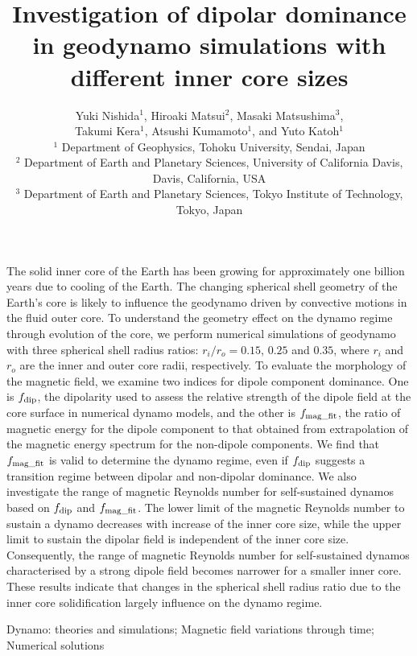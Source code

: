 \documentclass[mreferee]{gji}
\title[Dipolar dominance in geodynamo with different inner core sizes]
{Investigation of dipolar dominance in geodynamo simulations with different inner core sizes}
\author[Y. Nishida et al.]
{Yuki Nishida$^1$, Hiroaki Matsui$^2$, Masaki Matsushima$^3$,\\ 
{\rm \LARGE
Takumi Kera$^1$, Atsushi Kumamoto$^1$, and Yuto Katoh$^1$ }\\
  $^1$ Department of Geophysics, Tohoku University, Sendai, Japan \\
  $^2$ Department of Earth and Planetary Sciences, University of California Davis, Davis, California, USA \\
  $^3$ Department of Earth and Planetary Sciences, Tokyo Institute of Technology, Tokyo, Japan
  }
\date{ }
\begin{document}
\maketitle
%
\begin{summary}
The solid inner core of the Earth has been growing for approximately one billion years due to cooling of the Earth.
The changing spherical shell geometry of the Earth’s core is likely to influence the geodynamo driven by convective motions in the fluid outer core.
To understand the geometry effect on the dynamo regime through evolution of the core, we perform numerical simulations of geodynamo with three spherical shell radius ratios: $r_{i}/r_{o} = 0.15$, $0.25$ and $0.35$, where $r_{i}$ and $r_{o}$ are the inner and outer core radii, respectively.
To evaluate the morphology of the magnetic field, we examine two indices for dipole component dominance.
%
One is $f_{\rm dip}$, the dipolarity used to assess the relative strength of the dipole field at the core surface in numerical dynamo models, and the other is $f_{\rm mag\_fit}$, the ratio of magnetic energy for the dipole component to that obtained from extrapolation of the magnetic energy spectrum for the non-dipole components.
We find that $f_{\rm mag\_fit}$ is valid to determine the dynamo regime, even if $f_{\rm dip}$ suggests a transition regime between dipolar and non-dipolar dominance.
We also investigate the range of 
magnetic Reynolds number
for self-sustained dynamos based on $f_{\rm dip}$ and $f_{\rm mag\_fit}$.
The lower limit of the magnetic Reynolds number to sustain a dynamo decreases with increase of the inner core size, while the upper limit to sustain the dipolar field is independent of the inner core size. 
Consequently, the range of magnetic Reynolds number for self-sustained dynamos characterised by a strong dipole field becomes narrower for a smaller inner core.
These results indicate that changes in the spherical shell radius ratio due to the inner core solidification largely influence on the dynamo regime.
\end{summary}
%
\begin{keywords}
Dynamo: theories and simulations; Magnetic field variations through time; Numerical solutions
\end{keywords}
%

%

%

%

%

%

%
\end{document}
